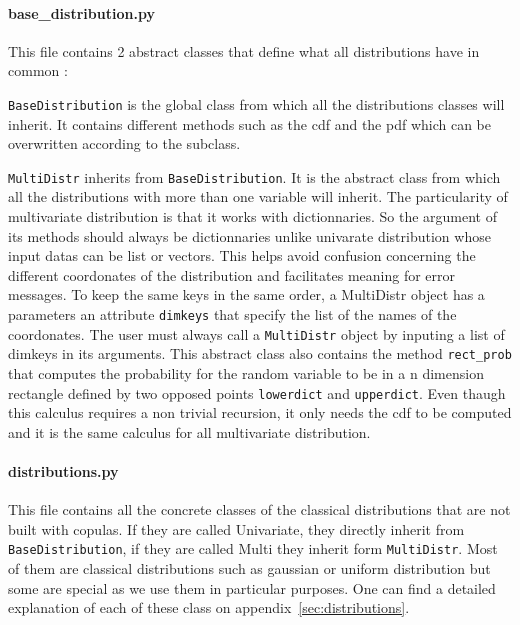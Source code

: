 \documentclass{article}
\begin{document}
	 
	 \paragraph{base\_distribution.py}
	 This file contains 2 abstract classes that define what all distributions have in common :\newline
	 
	 \texttt{BaseDistribution} is the global class from which all the distributions classes will inherit. It contains different methods such as the cdf and the pdf which can be overwritten according to the subclass. \newline
	
	 \texttt{MultiDistr} inherits from \texttt{BaseDistribution}. It is the abstract class from which all the distributions with more than one variable will inherit. The particularity of multivariate distribution is that it works with dictionnaries. So the argument of its methods should always be dictionnaries unlike univarate distribution whose input datas can be list or vectors. This helps avoid confusion concerning the different coordonates of the distribution and facilitates meaning for error messages. To keep the same keys in the same order, a MultiDistr object has a parameters an attribute \texttt{dimkeys} that specify the list of the names of the coordonates. The user must always call a \texttt{MultiDistr} object by inputing a list of dimkeys in its arguments. This abstract class also contains the method \texttt{rect\_prob} that computes the probability for the random variable to be in a n dimension rectangle defined by two opposed points \texttt{lowerdict} and \texttt{upperdict}. Even thaugh this calculus requires a non trivial recursion, it only needs the cdf to be computed and it is the same calculus for all multivariate distribution.
	 
	 \paragraph{distributions.py}
	 
	 This file contains all the concrete classes of the classical distributions that are not built with copulas. If they are called Univariate, they directly inherit from \texttt{BaseDistribution}, if they are called Multi they inherit form \texttt{MultiDistr}. Most of them are classical distributions such as gaussian or uniform distribution but some are special as we use them in particular purposes. One can find a detailed explanation of each of these class on appendix~\ref{sec:distributions}. \newline
	 
\end{document}
